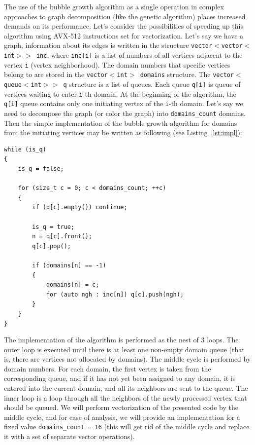 \documentclass[
11pt,%
tightenlines,%
twoside,%
onecolumn,%
nofloats,%
nobibnotes,%
nofootinbib,%
superscriptaddress,%
noshowpacs,%
centertags]%
{revtex4}
\begin{document}
The use of the bubble growth algorithm as a single operation in complex approaches to graph decomposition (like the genetic algorithm) places increased demands on its performance.
Let's consider the possibilities of speeding up this algorithm using AVX-512 instructions set for vectorization.
Let's say we have a graph, information about its edges is written in the structure \texttt{vector$<$vector$<$int$>>$ inc}, where \texttt{inc[i]} is a list of numbers of all vertices adjacent to the vertex \texttt{i} (vertex neighborhood).
The domain numbers that specific vertices belong to are stored in the \texttt{vector$<$int$>$ domains} structure.
The \texttt{vector$<$queue$<$int$>>$ q} structure is a list of queues.
Each queue \texttt{q[i]} is queue of vertices waiting to enter \texttt{i}-th domain.
At the beginning of the algorithm, the \texttt{q[i]} queue contains only one initiating vertex of the \texttt{i}-th domain.
Let's say we need to decompose the graph (or color the graph) into \texttt{domains\_count} domains.
Then the simple implementation of the bubble growth algorithm for domains from the initiating vertices may be written as following (see Listing~\ref{lst:impl}):

\begin{lstlisting}[caption={Implementation of the bubble domain growth algorithm.},label={lst:impl}]
while (is_q)
{
    is_q = false;

    for (size_t c = 0; c < domains_count; ++c)
    {
        if (q[c].empty()) continue;

        is_q = true;
        n = q[c].front();
        q[c].pop();

        if (domains[n] == -1)
        {
            domains[n] = c;
            for (auto ngh : inc[n]) q[c].push(ngh);
        }
    }
}
\end{lstlisting}

The implementation of the algorithm is performed as the nest of 3 loops.
The outer loop is executed until there is at least one non-empty domain queue (that is, there are vertices not allocated by domains).
The middle cycle is performed by domain numbers.
For each domain, the first vertex is taken from the corresponding queue, and if it has not yet been assigned to any domain, it is entered into the current domain, and all its neighbors are sent to the queue.
The inner loop is a loop through all the neighbors of the newly processed vertex that should be queued.
We will perform vectorization of the presented code by the middle cycle, and for ease of analysis, we will provide an implementation for a fixed value \texttt{domains\_count = 16} (this will get rid of the middle cycle and replace it with a set of separate vector operations).
\end{document}
